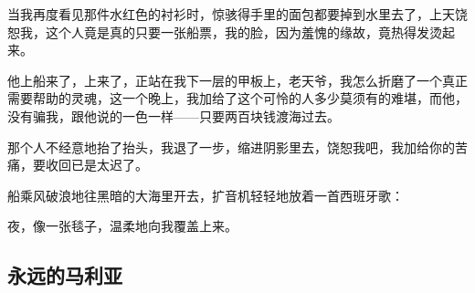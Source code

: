 \par 当我再度看见那件水红色的衬衫时，惊骇得手里的面包都要掉到水里去了，上天饶恕我，这个人竟是真的只要一张船票，我的脸，因为羞愧的缘故，竟热得发烫起来。
\par 他上船来了，上来了，正站在我下一层的甲板上，老天爷，我怎么折磨了一个真正需要帮助的灵魂，这一个晚上，我加给了这个可怜的人多少莫须有的难堪，而他，没有骗我，跟他说的一色一样——只要两百块钱渡海过去。
\par 那个人不经意地抬了抬头，我退了一步，缩进阴影里去，饶恕我吧，我加给你的苦痛，要收回已是太迟了。
\par 船乘风破浪地往黑暗的大海里开去，扩音机轻轻地放着一首西班牙歌：
\par 夜，像一张毯子，温柔地向我覆盖上来。


\subsection{永远的马利亚}

